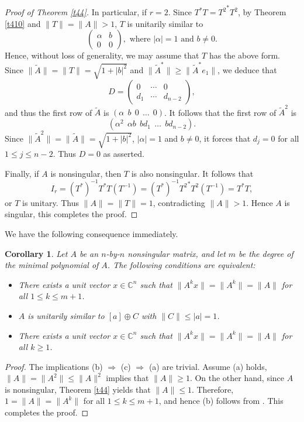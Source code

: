 \documentclass[11pt]{article}
\newtheorem{corollary}[theorem]{Corollary}
\numberwithin{equation}{section}
\begin{document}
\begin{proof}[Proof of Theorem \ref{t44}]
\medskip

In particular, if $r=2$. Since $T^*T={T^2}^*T^2$, by Theorem \ref{t410} and $\|T\|=\|A\|>1$,
$T$ is unitarily similar to
\[
 \begin{pmatrix}
\alpha & b\\
0 & 0
\end{pmatrix},   \mbox{ where }
 |\alpha|=1 \mbox{ and } b\ne 0.
\]
Hence, without loss of generality, we may assume that $T$ has the above form.
Since $\|\widetilde{A}\| = \|T\| = \sqrt{1+|b|^2}$ and $\|\widetilde{A}^*\| \ge \|\widetilde{A}^* e_1\|$,
we deduce that
\[
D = \begin{pmatrix}
0 & \cdots & 0\\
d_1 & \cdots & d_{n-2}
\end{pmatrix},
\]
and thus the first row of $\widetilde{A}$ is $(\alpha \ \ b \ \ 0 \ \ \dots \ \ 0)$. It follows that the first row of $\widetilde{A}^2$ is
$$(\alpha^2 \ \ \alpha b \ \ bd_1 \ \ \dots \ \ bd_{n-2}).$$
Since $\|\widetilde{A}^2\| =\|\widetilde{A}\|=\sqrt{1+|b|^2}$, $|\alpha|=1$ and $b\neq 0$, it forces that $d_j=0$ for all $1\le j\le n-2$.
Thus $D=0$ as asserted.

Finally, if $A$ is nonsingular, then $T$ is also nonsingular. It follows that
$$I_r=(T^*)^{-1}T^*T(T^{-1})= (T^*)^{-1}{T^2}^*T^2(T^{-1})=T^*T,$$
or $T$ is unitary. Thus $\|A\|=\|T\|=1$, contradicting $\|A\|>1$. Hence $A$ is singular, this completes the proof.
\end{proof}

We have the following consequence immediately.

\begin{corollary}\label{cor412}
Let $A$ be an $n$-by-$n$ nonsingular matrix, and let $m$ be the degree of the minimal polynomial of $A$.
The following conditions are equivalent:
\begin{itemize}
\item[\rm (a)] There exists a unit vector $x \in \mathbb{C}^n$ such that $\|A^k x\| = \|A^k\| = \|A\|$ for all $1\le k \le m+1$.
\item[\rm (b)] $A$ is unitarily similar to $[a] \oplus C$ with $\|C\| \le |a| = 1$.

\item[\rm (c)] There exists a unit vector $x \in \mathbb{C}^n$ such that $\|A^k x\| = \|A^k\| = \|A\|$ for all $k \ge 1$.
\end{itemize}
\end{corollary}

\begin{proof}
The implications (b) $\Rightarrow$ (c) $\Rightarrow$ (a) are trivial. Assume (a) holds, $\|A\|=\|A^2\|\le \|A\|^2$ implies that $\|A\|\ge 1$. On the other hand, since $A$ is nonsingular,  Theorem \ref{t44} yields that $\|A\|\le 1$. Therefore, $1=\|A\|=\|A^k\|$ for all $1\le k\le m+1$, and hence (b) follows from \cite[Theorem 2.1]{P}.
This completes the proof.
\end{proof}
\end{document}
